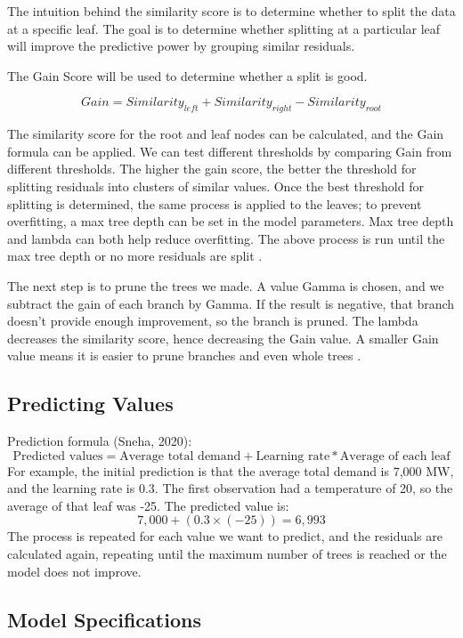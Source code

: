 \documentclass[mstat,12pt]{unswthesis}
\begin{document}
The intuition behind the similarity score is to determine whether to
split the data at a specific leaf. The goal is to determine whether
splitting at a particular leaf will improve the predictive power by
grouping similar residuals.

The Gain Score will be used to determine whether a split is good.

\[
Gain = {Similarity}_{left} + {Similarity}_{right} - {Similarity}_{root}
\]

The similarity score for the root and leaf nodes can be calculated, and
the Gain formula can be applied. We can test different thresholds by
comparing Gain from different thresholds. The higher the gain score, the
better the threshold for splitting residuals into clusters of similar
values. Once the best threshold for splitting is determined, the same
process is applied to the leaves; to prevent overfitting, a max tree
depth can be set in the model parameters. Max tree depth and lambda can
both help reduce overfitting. The above process is run until the max
tree depth or no more residuals are split \cite{a2016_how}.

The next step is to prune the trees we made. A value Gamma is chosen,
and we subtract the gain of each branch by Gamma. If the result is
negative, that branch doesn't provide enough improvement, so the branch
is pruned. The lambda decreases the similarity score, hence decreasing
the Gain value. A smaller Gain value means it is easier to prune
branches and even whole trees \cite{a2016_how}.

\subsection{Predicting Values}\label{predicting-values}

Prediction formula (Sneha, 2020): \[
\text{Predicted values} = \text{Average total demand} + \text{Learning rate} * \text{Average of each leaf}
\] For example, the initial prediction is that the average total demand
is 7,000 MW, and the learning rate is 0.3. The first observation had a
temperature of 20, so the average of that leaf was -25. The predicted
value is: \[
7,000 + (0.3 \times (-25)) = 6,993
\] The process is repeated for each value we want to predict, and the
residuals are calculated again, repeating until the maximum number of
trees is reached or the model does not improve.

\subsection{Model Specifications}\label{model-specifications}
\end{document}
